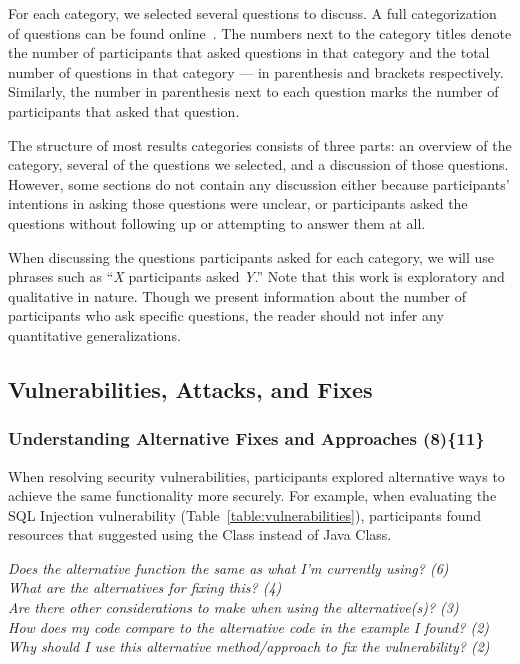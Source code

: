 \documentclass{acm_proc_article-sp}
\begin{document}
For each category, we selected several questions to discuss. A full categorization of questions can be found online~\cite{ExperimentalMaterials}.
The numbers next to the category titles denote the number of participants that asked questions in that category and the total number of questions in that category --- in parenthesis and brackets respectively. Similarly, the number in parenthesis next to each question marks the number of participants that asked that question.

The structure of most results categories consists of three parts: an overview of the category, several of the questions we selected, and a discussion of those questions.
However, some sections do not contain any discussion either because participants' intentions in asking those questions were unclear, or participants asked the questions without following up or attempting to answer them at all. 

When discussing the questions participants asked for each category, we will use phrases such as ``\emph{X} participants asked \emph{Y}.''
Note that this work is exploratory and qualitative in nature.
Though we present information about the number of participants who ask specific questions, the reader should not infer any quantitative generalizations.

\subsection{Vulnerabilities, Attacks, and Fixes}
\label{sec:results-vaf}



\subsubsection{\textbf{Understanding Alternative Fixes and Approaches (8)\{11\}}}\label{uafa}

When resolving security vulnerabilities, participants explored alternative ways to achieve the same functionality more securely.
For example, when evaluating the SQL Injection vulnerability (Table~\ref{table:vulnerabilities}), participants found resources that suggested using the  Class instead of Java  Class. 

\noindent\emph{Does the alternative function the same as what I'm currently using? (6)} \\
\emph{What are the alternatives for fixing this? (4)} \\
\emph{Are there other considerations to make when using the alternative(s)? (3)} \\
\emph{How does my code compare to the alternative code in the example I found? (2)} \\
\emph{Why should I use this alternative method/approach to fix the vulnerability? (2)} 
\end{document}
